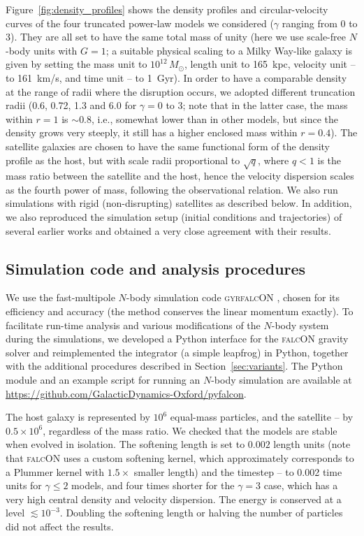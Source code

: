 \documentclass[twocolumn]{aastex63}
\begin{document}
Figure~\ref{fig:density_profiles} shows the density profiles and circular-velocity curves of the four truncated power-law models we considered ($\gamma$ ranging from 0 to 3). They are all set to have the same total mass of unity (here we use scale-free $N$-body units with $G=1$; a suitable physical scaling to a Milky Way-like galaxy is given by setting the mass unit to $10^{12}\,M_\odot$, length unit to 165~kpc, velocity unit -- to 161~km/s, and time unit -- to 1~Gyr). In order to have a comparable density at the range of radii where the disruption occurs, we adopted different truncation radii (0.6, 0.72, 1.3 and 6.0 for $\gamma=0$ to 3; note that in the latter case, the mass within $r=1$ is $\sim 0.8$, i.e., somewhat lower than in other models, but since the density grows very steeply, it still has a higher enclosed mass within $r=0.4$). The satellite galaxies are chosen to have the same functional form of the density profile as the host, but with scale radii proportional to $\sqrt{q}$, where $q<1$ is the mass ratio between the satellite and the host, hence the velocity dispersion scales as the fourth power of mass, following the observational \citet{Faber1976} relation. We also run simulations with rigid (non-disrupting) satellites as described below. In addition, we also reproduced the simulation setup (initial conditions and trajectories) of several earlier works \citep{Zaritsky1988, Hernquist1989, Cora1997} and obtained a very close agreement with their results.

\subsection{Simulation code and analysis procedures}   \label{sec:nbody_code}

We use the fast-multipole $N$-body simulation code \textsc{gyrfalcON} \citep{Dehnen2000}, chosen for its efficiency and accuracy (the method conserves the linear momentum exactly). To facilitate run-time analysis and various modifications of the $N$-body system during the simulations, we developed a Python interface for the \textsc{falcON} gravity solver and reimplemented the integrator (a simple leapfrog) in Python, together with the additional procedures described in Section~\ref{sec:variants}. The Python module and an example script for running an $N$-body simulation are available at \url{https://github.com/GalacticDynamics-Oxford/pyfalcon}.

The host galaxy is represented by $10^6$ equal-mass particles, and the satellite -- by $0.5\times10^6$, regardless of the mass ratio. We checked that the models are stable when evolved in isolation. The softening length is set to $0.002$ length units (note that \textsc{falcON} uses a custom softening kernel, which approximately corresponds to a Plummer kernel with $1.5\times$ smaller length) and the timestep -- to 0.002 time units for $\gamma\le 2$ models, and four times shorter for the $\gamma=3$ case, which has a very high central density and velocity dispersion. The energy is conserved at a level $\lesssim 10^{-3}$. Doubling the softening length or halving the number of particles did not affect the results.
\end{document}
